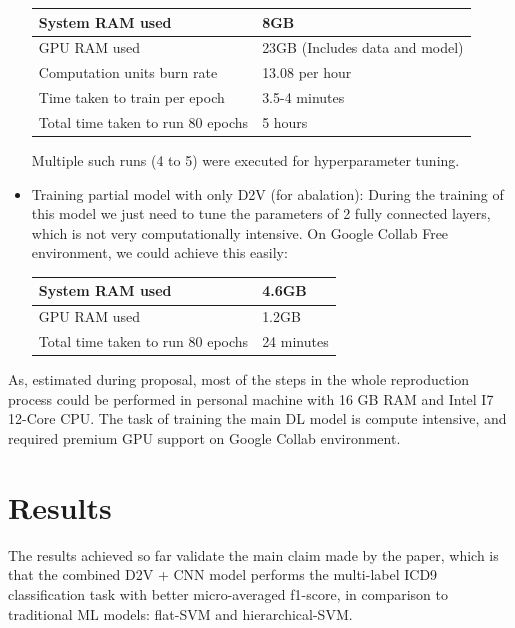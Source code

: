 \documentclass[11pt,a4paper]{article}
\begin{document}
\begin{itemize}
\begin{tiny}
\begin{tabular}{ ll }
	\hline
   		System RAM used & 8GB \\
  	\hline
    		GPU RAM used & 23GB (Includes data and model) \\ 
  	\hline
    		Computation units burn rate & 13.08 per hour \\
  	\hline
  		Time taken to train per epoch & 3.5-4 minutes \\
  	\hline
  		Total time taken to run 80 epochs & 5 hours \\
  	\hline
\end{tabular}
\end{tiny}
\newline

Multiple such runs (4 to 5) were executed for hyperparameter tuning.
	\item Training partial model with only D2V (for abalation): During the training of this model we just need to tune the parameters of 2 fully connected layers, which is not very computationally intensive. On Google Collab Free environment, we could achieve this easily:
\newline

\begin{small}
\begin{tabular}{ ll }
	\hline
   		System RAM used & 4.6GB \\
  	\hline
    		GPU RAM used & 1.2GB \\
  	\hline
  		Total time taken to run 80 epochs & 24 minutes \\
  	\hline
\end{tabular}
\end{small}
\newline
	
\end{itemize}


As, estimated during proposal, most of the steps in the whole reproduction process could be performed in personal machine with 16 GB RAM and Intel I7 12-Core CPU. The task of training the main DL model is compute intensive, and required premium GPU support on Google Collab environment.

\section{Results}

The results achieved so far validate the main claim made by the paper, which is that the combined D2V + CNN model performs the multi-label ICD9 classification task with better micro-averaged f1-score, in comparison to traditional ML models: flat-SVM and hierarchical-SVM.
\end{document}

